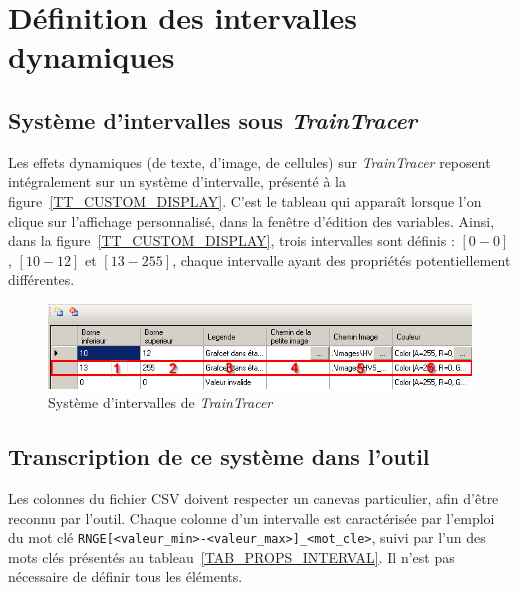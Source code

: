 \documentclass{AlstomLibrary}
\newcommand{\progname}[1]{\textit{#1}}
\newcommand{\TT}{{\progname{TrainTracer}} }
\begin{document}
\section{Définition des intervalles dynamiques} \label{SECT_DYN_INTERVAL}

\subsection{Système d'intervalles sous \TT}

Les effets dynamiques (de texte, d'image, de cellules) sur \TT reposent intégralement sur un  système d'intervalle, présenté à la figure~\vref{TT_CUSTOM_DISPLAY}. C'est le tableau qui apparaît lorsque l'on clique sur l'affichage personnalisé, dans la fenêtre d'édition des variables. Ainsi, dans la figure~\vref{TT_CUSTOM_DISPLAY}, trois intervalles sont définis : $[0-0]$, $[10-12]$ et $[13-255]$, chaque intervalle ayant des propriétés potentiellement différentes.

\begin{figure}\centering
\includegraphics[scale=0.5]{TT_Custom_display.png}
\caption{Système d'intervalles de \TT}\label{TT_CUSTOM_DISPLAY}
\end{figure}

\subsection{Transcription de ce système dans l'outil}

Les colonnes du fichier CSV doivent respecter un canevas particulier, afin d'être reconnu par l'outil. Chaque colonne d'un intervalle est caractérisée par l'emploi du mot clé \lstinline{RNGE[<valeur_min>-<valeur_max>]_<mot_cle>}, suivi par l'un des mots clés présentés au tableau~\vref{TAB_PROPS_INTERVAL}. Il n'est pas nécessaire de définir tous les éléments.
\end{document}
